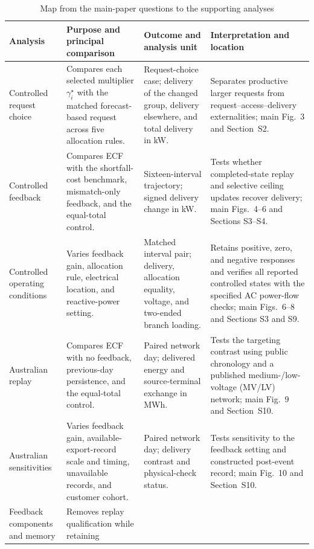 \documentclass[11pt]{article}
\begin{document}
\clearpage
\begin{table}[!ht]
\centering
\caption{Map from the main-paper questions to the supporting analyses}
\label{tab:supp_experiment_evidence_map}
\footnotesize
\setlength{\tabcolsep}{3.0pt}
\renewcommand{\arraystretch}{1.08}
\begin{tabularx}{\textwidth}{@{}>{\raggedright\arraybackslash}p{}>{\raggedright\arraybackslash}p{}>{\raggedright\arraybackslash}p{}>{\raggedright\arraybackslash}X@{}}
\toprule
Analysis & Purpose and principal comparison & Outcome and analysis unit & Interpretation and location \\
\midrule
Controlled request choice & Compares each selected multiplier
$\gamma_i^\star$ with the matched forecast-based request across five allocation
rules. & Request-choice case; delivery of the changed group, delivery elsewhere,
and total delivery in kW. & Separates productive larger requests from
request--access--delivery externalities; main Fig.~3 and Section~S2. \\
Controlled feedback & Compares ECF with the shortfall-cost benchmark,
mismatch-only feedback, and the equal-total control. & Sixteen-interval
trajectory; signed delivery change in kW. & Tests whether completed-state replay
and selective ceiling updates recover delivery; main Figs.~4--6 and Sections
S3--S4. \\
Controlled operating conditions & Varies feedback gain, allocation rule,
electrical location, and reactive-power setting. &
Matched interval pair; delivery, allocation equality, voltage, and two-ended
branch loading. & Retains positive, zero, and negative responses and verifies
all reported controlled states with the specified AC power-flow checks; main
Figs.~6--8 and Sections S3 and S9. \\
Australian replay & Compares ECF with no feedback, previous-day persistence,
and the equal-total control. & Paired network day; delivered energy and
source-terminal exchange in MWh. & Tests the targeting contrast using public
chronology and a published medium-/low-voltage (MV/LV) network; main Fig.~9 and
Section~S10. \\
Australian sensitivities & Varies feedback gain, available-export-record scale
and timing, unavailable records, and customer cohort. & Paired network day;
delivery contrast and physical-check status. & Tests sensitivity to the feedback
setting and constructed post-event record; main Fig.~10 and Section~S10. \\
Feedback components and memory & Removes replay qualification while retaining

\end{tabularx}
\end{table}
\end{document}
